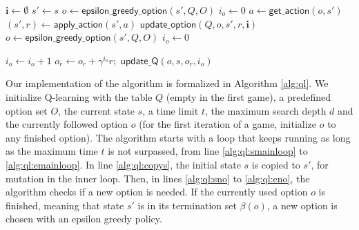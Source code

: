 \begin{algorithm}[h]
	\caption{$\mathsf{SMDP~Q-learning}(Q, O, s, t, d, o)$}
	\label{alg:ql}
	\begin{algorithmic}[1]
		\State $\mathbf{i} \gets \emptyset$ 
		 \label{alg:ql:smainloop}
			\State $s' \gets s$ \label{alg:ql:copys} 
			 \label{alg:ql:sno} 
				\State $o \gets \mathsf{epsilon\_greedy\_option}(s', Q, O)$ 
				\State $i_o \gets 0$ 
			\EndIf \label{alg:ql:eno}
			 \label{alg:ql:sfor}
				\State $a \gets \mathsf{get\_action}(o, s')$ 
				\State $(s', r) \gets \mathsf{apply\_action}(s', a)$ \label{alg:ql:apply}
				\State $\mathsf{update\_option}(Q, o, s', r, \mathbf{i})$ 
					\State $o \gets \mathsf{epsilon\_greedy\_option}(s', Q, O)$ 
					\State $i_o \gets 0$
				\EndIf
			\EndFor \label{alg:ql:efor}
		\EndWhile \label{alg:ql:emainloop}
		\State {}
	\end{algorithmic}
\end{algorithm}
\begin{algorithm}[h]
	\caption{$\mathsf{update\_option}(Q, o, s, r, \mathbf{i})$}
	\label{alg:update}
	\begin{algorithmic}[1]
		\State $i_o \gets i_o + 1$ 
		\State $o_r \gets o_r + \gamma^{i_o} r;$
		 \label{alg:ql:sp} 
			\State $\mathsf{update\_Q}(o, s, o_r, i_o)$ 
		\EndIf
	\end{algorithmic}
\end{algorithm}

Our implementation of the algorithm is formalized in Algorithm \ref{alg:ql}. We
initialize Q-learning with the table $Q$ (empty in the first game), a predefined
option set $O$, the current state $s$, a time limit $t$, the maximum search
depth $d$ and the currently followed option $o$ (for the first iteration of a
game, initialize $o$ to any finished option). The algorithm starts with a loop
that keeps running as long as the maximum time $t$ is not surpassed, from line
\ref{alg:ql:smainloop} to \ref{alg:ql:emainloop}. In line \ref{alg:ql:copys},
the initial state $s$ is copied to $s'$, for mutation in the inner loop. Then,
in lines \ref{alg:ql:sno} to \ref{alg:ql:eno}, the algorithm checks if a new
option is needed. If the currently used option $o$ is finished, meaning that
state $s'$ is in its termination set $\beta(o)$, a new option is chosen with an
epsilon greedy policy. 

